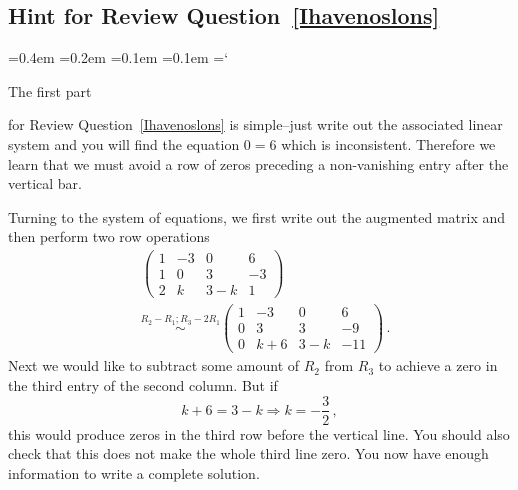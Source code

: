 
\subsection*{Hint for Review Question~\ref*{Ihavenoslons}}

{\ttfamily
{}\font=0.4em
\font=0.2em
\font=0.1em
\font=0.1em
\hyphenchar\font=`\-





\hypertarget{video_elementary_row_operations_hint}{The first part} for Review Question~\ref{Ihavenoslons} is simple--just 
write out the associated linear system and you will find the equation $0=6$ which is inconsistent. Therefore we learn 
that we must avoid a row of zeros preceding a non-vanishing entry after the vertical bar.

Turning to the system of equations, we first write out the augmented matrix and then perform two row operations
\begin{align*}
&\left(\begin{array}{ccc|c}1&-3&0&6\\1&0&3&-3\\2&k&3-k&1\end{array}\right)\\[2mm]
&\stackrel{R_2-R_1;R_3-2R_1}\sim
\left(\begin{array}{ccc|c}1&-3&0&6\\0&3&3&-9\\0&k+6&3-k&-11\end{array}\right)\, .
\end{align*}
Next we would like to subtract some amount of $R_2$ from $R_3$ to achieve a zero in the third entry of the second column. But if 
\[k+6=3-k\Rightarrow k=-\frac32\, ,\]
this would produce zeros in the third row before the vertical line.
You should also check that this does not make the whole third line zero. You now have enough information to write a complete solution.


}

